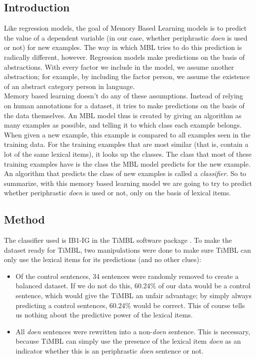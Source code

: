 \documentclass[12pt]{article}
\begin{document}
\subsection{Introduction}

Like regression models, the goal of Memory Based Learning models is to predict the value of a dependent variable (in our case, whether periphrastic \emph{doen} is used or not) for new examples. The way in which MBL tries to do this prediction is radically different, however. Regression models make predictions on the basis of abstractions. With every factor we include in the model, we assume another abstraction; for example, by including the factor person, we assume the existence of an abstract category person in language.\\\indent
Memory based learning doesn't do any of these assumptions. Instead of relying on human annotations for a dataset, it tries to make predictions on the basis of the data themselves. An MBL model thus is created by giving an algorithm as many examples as possible, and telling it to which class each example belongs. When given a new example, this example is compared to all examples seen in the training data. For the training examples that are most similar (that is, contain a lot of the same lexical items), it looks up the classes. The class that most of these training examples have is the class the MBL model predicts for the new example. An algorithm that predicts the class of new examples is called a \emph{classifier}. So to summarize, with this memory based learning model we are going to try to predict whether periphrastic \emph{doen} is used or not, only on the basis of lexical items.

\subsection{Method}

The classifier used is IB1-IG in the TiMBL software package \citep{d10}. To make the dataset ready for TiMBL, two manipulations were done to make sure TiMBL can only use the lexical items for its predictions (and no other clues):

\begin{itemize}

\item Of the control sentences, 34 sentences were randomly removed to create a balanced dataset. If we do not do this, 60.24\% of our data would be a control sentence, which would give the TiMBL an unfair advantage; by simply always predicting a control sentences, 60.24\% would be correct. This of course tells us nothing about the predictive power of the lexical items.
\item All \emph{doen} sentences were rewritten into a non-\emph{doen} sentence. This is necessary, because TiMBL can simply use the presence of the lexical item \emph{doen} as an indicator whether this is an periphrastic \emph{doen} sentence or not.

\end{itemize}
\end{document}
